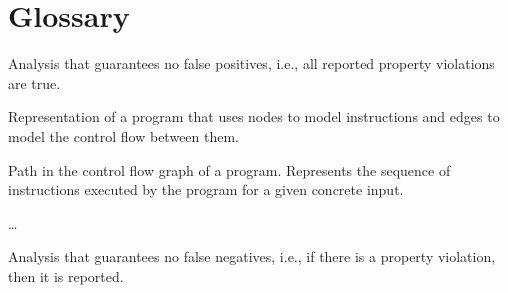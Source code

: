 
\section{Glossary}
\label{se:glossary}

 Analysis that guarantees no false positives, i.e., all reported property violations are true.

\smallskip{} Representation of a program that uses nodes to model instructions and edges to model the control flow between them.

\smallskip{} Path in the control flow graph of a program. Represents the sequence of instructions executed by the program for a given concrete input.

\smallskip{} \ldots

\smallskip{} Analysis that guarantees no false negatives, i.e., if there is a property violation, then it is reported.
